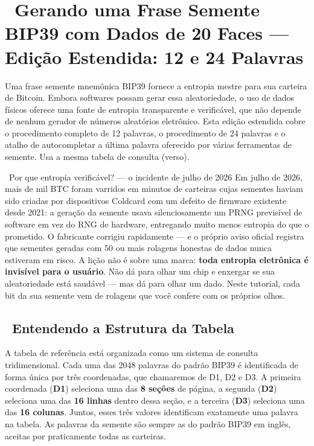 \documentclass[10pt]{article}
\begin{document}
\section*{\faBitcoin~Gerando uma Frase Semente BIP39 com Dados de 20 Faces --- Edição Estendida: 12 e 24 Palavras}

\footnotesize

Uma frase semente mnemônica BIP39 fornece a entropia mestre para sua carteira de Bitcoin. Embora softwares possam gerar essa aleatoriedade, o uso de dados físicos oferece uma fonte de entropia transparente e verificável, que não depende de nenhum gerador de números aleatórios eletrônico. Esta edição estendida cobre o procedimento completo de 12 palavras, o procedimento de 24 palavras e o atalho de autocompletar a última palavra oferecido por várias ferramentas de semente. Usa a mesma tabela de consulta (verso).

\begin{contextbox}{\faNewspaper~Por que entropia verificável? --- o incidente de julho de 2026}
Em julho de 2026, mais de mil BTC foram varridos em minutos de carteiras cujas sementes haviam sido criadas por dispositivos Coldcard com um defeito de firmware existente desde 2021: a geração da semente usava silenciosamente um PRNG previsível de software em vez do RNG de hardware, entregando muito menos entropia do que o prometido. O fabricante corrigiu rapidamente --- e o próprio aviso oficial registra que sementes geradas com 50 ou mais rolagens honestas de dados nunca estiveram em risco. A lição não é sobre uma marca: \textbf{toda entropia eletrônica é invisível para o usuário}. Não dá para olhar um chip e enxergar se sua aleatoriedade está saudável --- mas dá para olhar um dado. Neste tutorial, cada bit da sua semente vem de rolagens que você confere com os próprios olhos.
\end{contextbox}

\subsection*{\faTable~Entendendo a Estrutura da Tabela}

A tabela de referência está organizada como um sistema de consulta
tridimensional. Cada uma das 2048 palavras do padrão BIP39 é identificada de forma única por três coordenadas, que chamaremos de D1, D2 e D3. A primeira coordenada (\textbf{D1}) seleciona uma das \textbf{8 seções} de página, a segunda (\textbf{D2}) seleciona uma das \textbf{16 linhas} dentro dessa seção, e a terceira (\textbf{D3}) seleciona uma das \textbf{16 colunas}. Juntos, esses três valores identificam exatamente uma palavra na tabela. As palavras da semente são sempre as do padrão BIP39 em inglês, aceitas por praticamente todas as carteiras.
\end{document}
